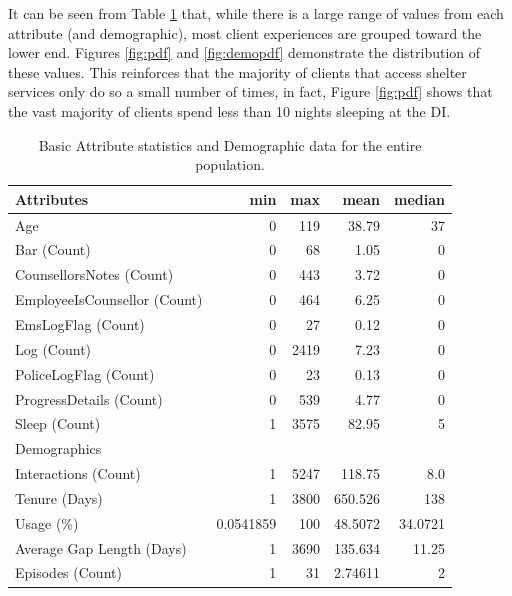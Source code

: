 It can be seen from Table \ref{tbl:stats:notchronic} that, while there is a large range of values from each attribute (and demographic), most client experiences are grouped toward the lower end. Figures \ref{fig:pdf} and \ref{fig:demopdf} demonstrate the distribution of these values. This reinforces that the majority of clients that access shelter services only do so a small number of times, in fact, Figure \ref{fig:pdf} shows that the vast majority of clients spend less than 10 nights sleeping at the DI.


\begin{table}[h]
	\centering

	\begin{tabular}{lrrrr}
	\toprule
	Attributes													 &        min &   max &     mean &   median \\
	\midrule
	Age                          &          0 &   119 &    38.79 &       37 \\
	Bar (Count)                  &          0 &    68 &     1.05 &        0 \\
	CounsellorsNotes (Count)     &          0 &   443 &     3.72 &        0 \\
	EmployeeIsCounsellor (Count) &          0 &   464 &     6.25 &        0 \\
	EmsLogFlag (Count)           &          0 &    27 &     0.12 &        0 \\
	Log (Count)                  &          0 &  2419 &     7.23 &        0 \\
	PoliceLogFlag (Count)        &          0 &    23 &     0.13 &        0 \\
	ProgressDetails (Count)      &          0 &   539 &     4.77 &        0 \\
	Sleep (Count)                &          1 &  3575 &    82.95 &        5 \\
	\midrule
	Demographics								 &         &    &      &    \\
	\midrule
	Interactions (Count)         &          1 &  5247 &   118.75 &      8.0 \\
	Tenure (Days)                &          1 &  3800 &  650.526 &      138 \\
	Usage (\%)                    &  0.0541859 &   100 &  48.5072 &  34.0721 \\
	Average Gap Length (Days)    &          1 &  3690 &  135.634 &    11.25 \\
	Episodes (Count)             &          1 &    31 &  2.74611 &        2 \\
	\bottomrule
	\end{tabular}

	\caption{Basic Attribute statistics and Demographic data for the entire population.}
	\label{tbl:stats:notchronic}
\end{table}

